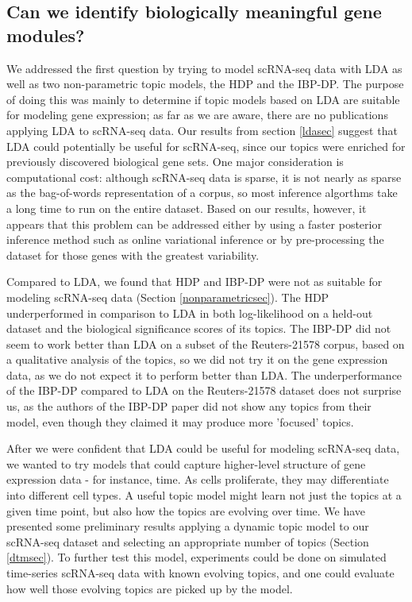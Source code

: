 \documentclass{article}
\begin{document}
\subsection{Can we identify biologically meaningful gene modules?}
We addressed the first question by trying to model scRNA-seq data with LDA as well as two non-parametric topic models, the HDP and the IBP-DP. The purpose of doing this was mainly to determine if topic models based on LDA are suitable for modeling gene expression; as far as we are aware, there are no publications applying LDA to scRNA-seq data. Our results from section \ref{ldasec} suggest that LDA could potentially be useful for scRNA-seq, since our topics were enriched for previously discovered biological gene sets. One major consideration is computational cost: although scRNA-seq data is sparse, it is not nearly as sparse as the bag-of-words representation of a corpus, so most inference algorthms take a long time to run on the entire dataset. Based on our results, however, it appears that this problem can be addressed either by using a faster posterior inference method such as online variational inference or by pre-processing the dataset for those genes with the greatest variability.

Compared to LDA, we found that HDP and IBP-DP were not as suitable for modeling scRNA-seq data (Section \ref{nonparametricsec}). The HDP underperformed in comparison to LDA in both log-likelihood on a held-out dataset and the biological significance scores of its topics. The IBP-DP did not seem to work better than LDA on a subset of the Reuters-21578 corpus, based on a qualitative analysis of the topics, so we did not try it on the gene expression data, as we do not expect it to perform better than LDA. The underperformance of the IBP-DP compared to LDA on the Reuters-21578 dataset does not surprise us, as the authors of the IBP-DP paper did not show any topics from their model, even though they claimed it may produce more 'focused' topics.

After we were confident that LDA could be useful for modeling scRNA-seq data, we wanted to try models that could capture higher-level structure of gene expression data - for instance, time. As cells proliferate, they may differentiate into different cell types. A useful topic model might learn not just the topics at a given time point, but also how the topics are evolving over time. We have presented some preliminary results applying a dynamic topic model to our scRNA-seq dataset and selecting an appropriate number of topics (Section \ref{dtmsec}). To further test this model, experiments could be done on simulated time-series scRNA-seq data with known evolving topics, and one could evaluate how well those evolving topics are picked up by the model.
\end{document}
